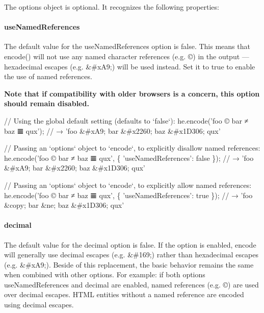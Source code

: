 The {\ttfamily options} object is optional. It recognizes the following properties\+:

\paragraph*{{\ttfamily use\+Named\+References}}

The default value for the {\ttfamily use\+Named\+References} option is {\ttfamily false}. This means that {\ttfamily encode()} will not use any named character references (e.\+g. {\ttfamily \copyright{}}) in the output — hexadecimal escapes (e.\+g. {\ttfamily \&\#x\+A9;}) will be used instead. Set it to {\ttfamily true} to enable the use of named references.

{\bfseries Note that if compatibility with older browsers is a concern, this option should remain disabled.}


\begin{DoxyCode}
// Using the global default setting (defaults to `false`):
he.encode('foo © bar ≠ baz 𝌆 qux');
// → 'foo &#xA9; bar &#x2260; baz &#x1D306; qux'

// Passing an `options` object to `encode`, to explicitly disallow named references:
he.encode('foo © bar ≠ baz 𝌆 qux', \{
  'useNamedReferences': false
\});
// → 'foo &#xA9; bar &#x2260; baz &#x1D306; qux'

// Passing an `options` object to `encode`, to explicitly allow named references:
he.encode('foo © bar ≠ baz 𝌆 qux', \{
  'useNamedReferences': true
\});
// → 'foo &copy; bar &ne; baz &#x1D306; qux'
\end{DoxyCode}


\paragraph*{{\ttfamily decimal}}

The default value for the {\ttfamily decimal} option is {\ttfamily false}. If the option is enabled, {\ttfamily encode} will generally use decimal escapes (e.\+g. {\ttfamily \&\#169;}) rather than hexadecimal escapes (e.\+g. {\ttfamily \&\#x\+A9;}). Beside of this replacement, the basic behavior remains the same when combined with other options. For example\+: if both options {\ttfamily use\+Named\+References} and {\ttfamily decimal} are enabled, named references (e.\+g. {\ttfamily \copyright{}}) are used over decimal escapes. H\+T\+ML entities without a named reference are encoded using decimal escapes.


